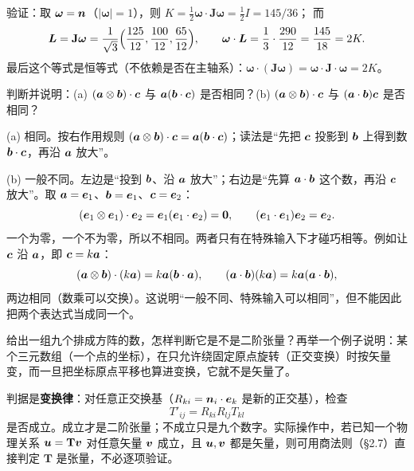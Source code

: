 \documentclass[11pt]{ctexart}
\newcommand{\ten}[1]{\mathbf{#1}}
\begin{document}
验证：取 $\boldsymbol\omega=\boldsymbol{n}$（$|\boldsymbol\omega|=1$），则 $K=\frac12\boldsymbol\omega\cdot\ten J\boldsymbol\omega=\frac12I=145/36$；
而
\[
\vect L=\ten J\boldsymbol\omega=\frac{1}{\sqrt3}\Bigl(\frac{125}{12},\frac{100}{12},\frac{65}{12}\Bigr),
\qquad
\boldsymbol\omega\cdot\vect L=\frac{1}{3}\cdot\frac{290}{12}=\frac{145}{18}=2K .
\]
最后这个等式是恒等式（不依赖是否在主轴系）：$\boldsymbol\omega\cdot(\ten J\boldsymbol\omega)=\boldsymbol\omega\cdot\ten J\cdot\boldsymbol\omega=2K$。

{判断并说明：(a) $(\boldsymbol{a}\otimes\boldsymbol{b})\cdot\boldsymbol{c}$ 与 $\boldsymbol{a}(\boldsymbol{b}\cdot\boldsymbol{c})$ 是否相同？(b) $(\boldsymbol{a}\otimes\boldsymbol{b})\cdot\boldsymbol{c}$ 与 $(\boldsymbol{a}\cdot\boldsymbol{b})\boldsymbol{c}$ 是否相同？}

(a) 相同。按右作用规则 $(\boldsymbol{a}\otimes\boldsymbol{b})\cdot\boldsymbol{c}=\boldsymbol{a}(\boldsymbol{b}\cdot\boldsymbol{c})$；读法是“先把 $\boldsymbol{c}$ 投影到 $\boldsymbol{b}$ 上得到数 $\boldsymbol{b}\cdot\boldsymbol{c}$，再沿 $\boldsymbol{a}$ 放大”。

(b) 一般不同。左边是“投到 $\boldsymbol{b}$、沿 $\boldsymbol{a}$ 放大”；右边是“先算 $\boldsymbol{a}\cdot\boldsymbol{b}$ 这个数，再沿 $\boldsymbol{c}$ 放大”。取 $\boldsymbol{a}=\boldsymbol{e}_1$、$\boldsymbol{b}=\boldsymbol{e}_1$、$\boldsymbol{c}=\boldsymbol{e}_2$：
\[
(\boldsymbol{e}_1\otimes\boldsymbol{e}_1)\cdot\boldsymbol{e}_2=\boldsymbol{e}_1(\boldsymbol{e}_1\cdot\boldsymbol{e}_2)=\boldsymbol{0},
\qquad
(\boldsymbol{e}_1\cdot\boldsymbol{e}_1)\boldsymbol{e}_2=\boldsymbol{e}_2 .
\]
一个为零，一个不为零，所以不相同。两者只有在特殊输入下才碰巧相等。例如让 $\boldsymbol{c}$ 沿 $\boldsymbol{a}$，即 $\boldsymbol{c}=k\boldsymbol{a}$：
\[
(\boldsymbol{a}\otimes\boldsymbol{b})\cdot(k\boldsymbol{a})=k\boldsymbol{a}(\boldsymbol{b}\cdot\boldsymbol{a}),
\qquad
(\boldsymbol{a}\cdot\boldsymbol{b})(k\boldsymbol{a})=k\boldsymbol{a}(\boldsymbol{a}\cdot\boldsymbol{b}),
\]
两边相同（数乘可以交换）。这说明“一般不同、特殊输入可以相同”，但不能因此把两个表达式当成同一个。

{给出一组九个排成方阵的数，怎样判断它是不是二阶张量？再举一个例子说明：某个三元数组（一个点的坐标），在只允许绕固定原点旋转（正交变换）时按矢量变，而一旦把坐标原点平移也算进变换，它就不是矢量了。}

判据是\textbf{变换律}：对任意正交换基（$R_{ki}=\boldsymbol{n}_i\cdot\boldsymbol{e}_k$ 是新的正交基），检查
\[
T'_{ij}=R_{ki}R_{lj}T_{kl}
\]
是否成立。成立才是二阶张量；不成立只是九个数字。实际操作中，若已知一个物理关系 $\vect u=\ten T\vect v$ 对任意矢量 $\boldsymbol{v}$ 成立，且 $\boldsymbol{u},\boldsymbol{v}$ 都是矢量，则可用商法则（\S2.7）直接判定 $\ten T$ 是张量，不必逐项验证。
\end{document}
